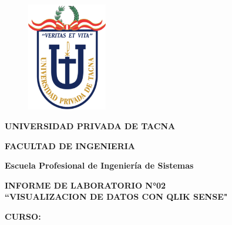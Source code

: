 \documentclass[12pt,letterpaper]{article}
\begin{document}
    \begin{titlepage}
        \begin{center}
            \begin{figure}[htb]
                \begin{center}
                    \includegraphics[width=3.5cm]{./img/logo}
                \end{center}
            \end{figure}
            \vspace*{0.15in}
            \begin{Large}
                \textbf{UNIVERSIDAD PRIVADA DE TACNA}\\
            \end{Large}
            \vspace*{0.15in}
            \begin{Large}
                \textbf{FACULTAD DE INGENIERIA} \\
            \end{Large}
            \vspace*{0.1in}
            \begin{Large}
                \textbf{Escuela Profesional de Ingeniería de Sistemas} \\
            \end{Large}
            \vspace*{0.3in}
            \begin{Large}
                \textbf{INFORME DE LABORATORIO N°02}\\
                \textbf{``VISUALIZACION DE DATOS CON QLIK SENSE"}\\
            \end{Large}
            \vspace*{0.2in}
            \begin{Large}
                \textbf{CURSO:} \\
            \end{Large}
            \vspace*{0.1in}
            \begin{large}

\end{large}
\end{center}
\end{titlepage}
\end{document}
